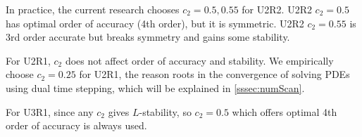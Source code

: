 \documentclass[preprint,12pt]{elsarticle}
\begin{document}
In practice, the current research chooses $c_2=0.5,0.55$ for U2R2.
U2R2 $c_2=0.5$ has optimal order of accuracy (4th order), but it is symmetric.
U2R2 $c_2=0.55$ is 3rd order accurate but breaks symmetry and gains some stability.

For U2R1, $c_2$ does not affect order of accuracy and stability.
We empirically choose $c_2=0.25$ for U2R1, the reason roots in
the convergence of solving PDEs using 
dual time stepping, which will be explained in \ref{sssec:numScan}.

For U3R1, since any $c_2$ gives $L$-stability, so $c_2=0.5$ which
offers optimal 4th order of accuracy is always used.







\end{document}
